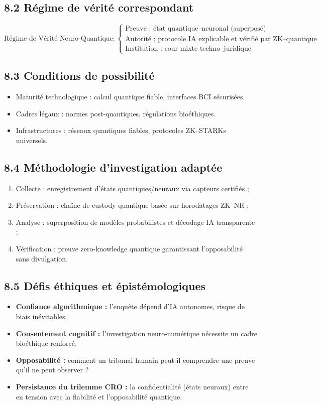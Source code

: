 \documentclass[12pt,a4paper]{article}
\begin{document}
\subsection{8.2 Régime de vérité correspondant}
\[
\text{Régime de Vérité Neuro-Quantique} :
\begin{cases}
\text{Preuve : état quantique–neuronal (superposé)} \\
\text{Autorité : protocole IA explicable et vérifié par ZK–quantique} \\
\text{Institution : cour mixte techno–juridique}
\end{cases}
\]

\subsection{8.3 Conditions de possibilité}
\begin{itemize}
  \item Maturité technologique : calcul quantique fiable, interfaces BCI sécurisées.  
  \item Cadres légaux : normes post-quantiques, régulations bioéthiques.  
  \item Infrastructures : réseaux quantiques fiables, protocoles ZK–STARKs universels.  
\end{itemize}

\subsection{8.4 Méthodologie d’investigation adaptée}
\begin{enumerate}
  \item Collecte : enregistrement d’états quantiques/neuraux via capteurs certifiés ;
  \item Préservation : chaîne de custody quantique basée sur horodatages ZK–NR ;
  \item Analyse : superposition de modèles probabilistes et décodage IA transparente ;
  \item Vérification : preuve zero-knowledge quantique garantissant l’opposabilité sans divulgation.
\end{enumerate}

\subsection{8.5 Défis éthiques et épistémologiques}
\begin{itemize}
  \item \textbf{Confiance algorithmique :} l’enquête dépend d’IA autonomes, risque de biais inévitables.  
  \item \textbf{Consentement cognitif :} l’investigation neuro-numérique nécessite un cadre bioéthique renforcé.  
  \item \textbf{Opposabilité :} comment un tribunal humain peut-il comprendre une preuve qu’il ne peut observer ?  
  \item \textbf{Persistance du trilemme CRO :} la confidentialité (états neuraux) entre en tension avec la fiabilité et l’opposabilité quantique.
\end{itemize}
\end{document}
